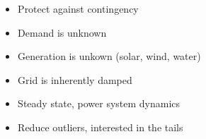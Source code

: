 \begin{frame}
\begin{columns}
\begin{column}{0.45\textwidth}
    \end{column}
    \begin{column}{0.45\textwidth}
      \begin{center}
      \end{center}
      \begin{itemize}
        \item Protect against contingency
        \item Demand is unknown
        \item Generation is unkown (solar, wind, water)
        \item Grid is inherently damped
        \item Steady state, power system dynamics
        \item Reduce outliers, interested in the tails
      \end{itemize}
    \end{column}
  \end{columns}
\end{frame}

